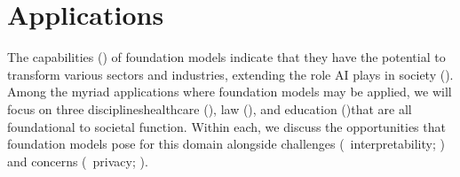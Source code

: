 \section{Applications}
\label{sec:applications}

The capabilities () of foundation models indicate that they have the potential to transform various sectors and industries, extending the role AI plays in society (). 
Among the myriad applications where foundation models may be applied, we will focus on three disciplines\dash{}healthcare (), law (), and education ()\dash{}that are all foundational to societal function. Within each, we discuss the opportunities that foundation models pose for this domain alongside challenges (\eg~interpretability; ) and concerns (\eg~privacy; ).





